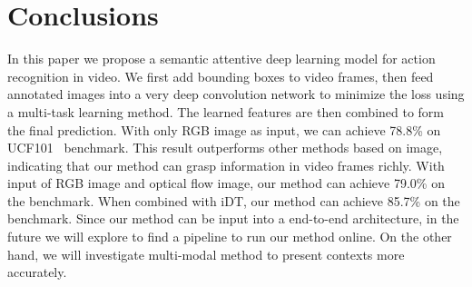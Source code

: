 \documentclass[10pt,twocolumn,letterpaper]{article}
\begin{document}
\section{Conclusions}\label{sec:conclusions}
In this paper we propose a semantic attentive deep learning model for action recognition in video. We first add bounding boxes to video frames, then feed annotated images into a very deep convolution network to minimize the loss using a multi-task learning method. The learned features are then combined to form the final prediction. With only RGB image as input, we can achieve 78.8\% on UCF101~\cite{soomro2012ucf101} benchmark. This result outperforms other methods based on image, indicating that our method can grasp information in video frames richly. With input of RGB image and optical flow image, our method can achieve 79.0\% on the benchmark. When combined with iDT, our method can achieve 85.7\% on the benchmark. Since our method can be input into a end-to-end architecture, in the future we will explore to find a pipeline to run our method online. On the other hand, we will investigate multi-modal method to present contexts more accurately. 
\clearpage
{\small
	
	
}
\end{document}

